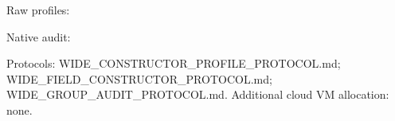 \documentclass[10pt]{article}
\begin{document}
\begin{flushleft}\footnotesize
Raw profiles:\par
{}\par
{}\par
Native audit:\par
{}\par
Protocols: WIDE_CONSTRUCTOR_PROFILE_PROTOCOL.md; WIDE_FIELD_CONSTRUCTOR_PROTOCOL.md;
WIDE_GROUP_AUDIT_PROTOCOL.md. Additional cloud VM allocation: none.
\end{flushleft}
\end{document}
